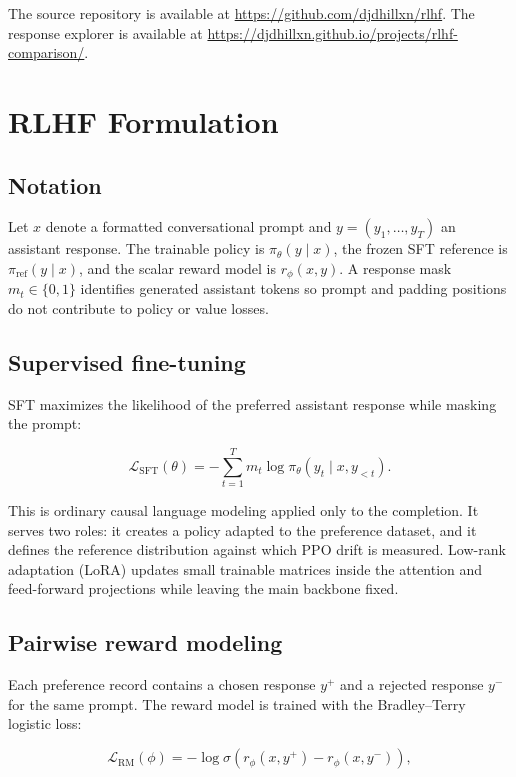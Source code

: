 \documentclass[11pt]{article}
\newcommand{\projecturl}{\url{https://github.com/djdhillxn/rlhf}}
\newcommand{\explorerurl}{\url{https://djdhillxn.github.io/projects/rlhf-comparison/}}
\begin{document}
The source repository is available at \projecturl{}. The response explorer is
available at \explorerurl{}.

\section{RLHF Formulation}

\subsection{Notation}

Let $x$ denote a formatted conversational prompt and
$y=(y_1,\ldots,y_T)$ an assistant response. The trainable policy is
$\pi_\theta(y\mid x)$, the frozen SFT reference is
$\pi_{\mathrm{ref}}(y\mid x)$, and the scalar reward model is
$r_\phi(x,y)$. A response mask $m_t\in\{0,1\}$ identifies generated assistant
tokens so prompt and padding positions do not contribute to policy or value
losses.

\subsection{Supervised fine-tuning}

SFT maximizes the likelihood of the preferred assistant response while
masking the prompt:

\begin{equation}
\mathcal{L}_{\mathrm{SFT}}(\theta)
=
-\sum_{t=1}^{T} m_t
\log \pi_\theta(y_t\mid x,y_{<t}).
\label{eq:sft}
\end{equation}

This is ordinary causal language modeling applied only to the completion. It
serves two roles: it creates a policy adapted to the preference dataset, and
it defines the reference distribution against which PPO drift is measured.
Low-rank adaptation (LoRA) \cite{hu2022} updates small trainable matrices
inside the attention and feed-forward projections while leaving the main
backbone fixed.

\subsection{Pairwise reward modeling}

Each preference record contains a chosen response $y^+$ and a rejected
response $y^-$ for the same prompt. The reward model is trained with the
Bradley--Terry logistic loss:

\begin{equation}
\mathcal{L}_{\mathrm{RM}}(\phi)
=
-\log \sigma\left(
r_\phi(x,y^+) - r_\phi(x,y^-)
\right),
\label{eq:rm}
\end{equation}
\end{document}
